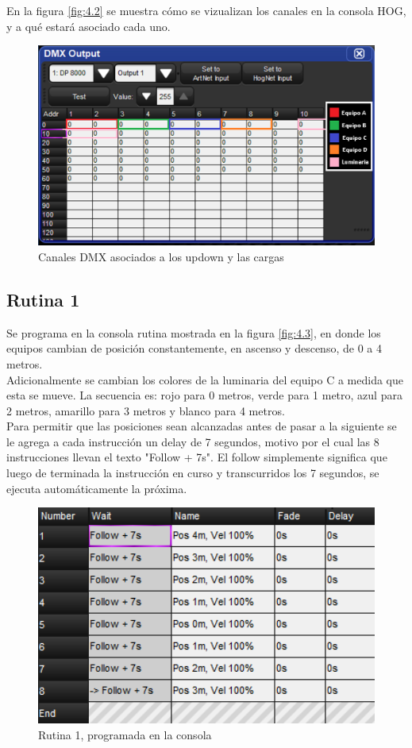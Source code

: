 En la figura \ref{fig:4.2} se muestra cómo se vizualizan los canales en la consola HOG, y a qué estará asociado cada uno. 

\begin{figure}[!ht]
	\centering
	\includegraphics[width=15cm,scale=1]{resources/4_2-direccionamiento.png}
	\caption{Canales DMX asociados a los updown y las cargas}
	\label{fig:\thefigure}
\end{figure}

\subsection{Rutina 1}
Se programa en la consola rutina mostrada en la figura \ref{fig:4.3}, en donde los equipos cambian de posición constantemente, en ascenso y descenso, de 0 a 4 metros. \\
Adicionalmente se cambian los colores de la luminaria del equipo C a medida que esta se mueve. La secuencia es: rojo para 0 metros, verde para 1 metro, azul para 2 metros, amarillo para 3 metros y blanco para 4 metros.\\
Para permitir que las posiciones sean alcanzadas antes de pasar a la siguiente se le agrega a cada instrucción un delay de 7 segundos, motivo por el cual las 8 instrucciones llevan el texto "Follow + 7s". El follow simplemente significa que luego de terminada la instrucción en curso y transcurridos los 7 segundos, se ejecuta automáticamente la próxima.
	
\begin{figure}[!ht]
	\centering
	\includegraphics[width=12cm,scale=1]{resources/4_3-cuelist1.png}
	\caption{Rutina 1, programada en la consola}
	\label{fig:\thefigure}
\end{figure}

